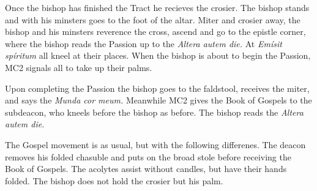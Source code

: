 {\rubric Once the bishop has finished the Tract he recieves the crosier. The
bishop stands and with his minsters goes to the foot of the altar. Miter and
crosier away, the bishop and his minsters reverence the cross, ascend and go to
the epistle corner, where the bishop reads the Passion up to the \textit{Altera
autem die.} At \textit{Emísit spíritum} all kneel at their places. When the
bishop is about to begin the Passion, MC2 signals all to take up their palms.

\rubric Upon completing the Passion the bishop goes to the faldstool, receives
the miter, and says the \textit{Munda cor meum.} Meanwhile MC2 gives the Book
of Gospels to the subdeacon, who kneels before the bishop as before. The bishop
reads the \textit{Altera autem die.}

\rubric The Gospel movement is as usual, but with the following differenes. The
deacon removes his folded chasuble and puts on the broad stole before receiving
the Book of Gospels. The acolytes assist without candles, but have their hands
folded. The bishop does not hold the crosier but his palm.

}











